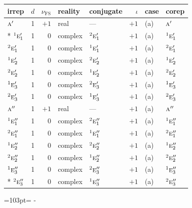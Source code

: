 \documentclass[10pt,a4paper]{article}
\newcommand{\needspace}[1]{\par\penalty-100\begingroup\dimen0=#1\relax\dimen2=\pagegoal
  \advance\dimen2-\pagetotal\ifdim\dimen0>\dimen2\relax\ifdim\dimen2>0pt\vfil\break\fi\fi
  \endgroup}
\numberwithin{equation}{section}
\newcommand{\irr}[1]{\text{\normalfont\scshape #1}}
\newcommand{\conjpair}[1]{{}^{#1}}
\newcommand{\fsind}{\nu_{\mathrm{FS}}}
\begin{document}
{\small\renewcommand{\arraystretch}{1.25}\setlength{\tabcolsep}{4pt}\begin{longtable}{@{}lrrllrll@{}}\toprule
irrep & $d$ & $\fsind$ & reality & conjugate & $\iota$ & case & corep\\\midrule\endhead
\bottomrule\endfoot\endlastfoot
$\irr{a}'$ & 1 & $+1$ & real & --- & $+1$ & (a) & $\irr{a}'$\\*
$\conjpair{1}\irr{e}_{1}'$ & 1 & $0$ & complex & $\conjpair{2}\irr{e}_{1}'$ & $+1$ & (a) & $\conjpair{1}\irr{e}_{1}'$\\
$\conjpair{2}\irr{e}_{1}'$ & 1 & $0$ & complex & $\conjpair{1}\irr{e}_{1}'$ & $+1$ & (a) & $\conjpair{2}\irr{e}_{1}'$\\
$\conjpair{1}\irr{e}_{2}'$ & 1 & $0$ & complex & $\conjpair{2}\irr{e}_{2}'$ & $+1$ & (a) & $\conjpair{1}\irr{e}_{2}'$\\
$\conjpair{2}\irr{e}_{2}'$ & 1 & $0$ & complex & $\conjpair{1}\irr{e}_{2}'$ & $+1$ & (a) & $\conjpair{2}\irr{e}_{2}'$\\
$\conjpair{1}\irr{e}_{3}'$ & 1 & $0$ & complex & $\conjpair{2}\irr{e}_{3}'$ & $+1$ & (a) & $\conjpair{1}\irr{e}_{3}'$\\
$\conjpair{2}\irr{e}_{3}'$ & 1 & $0$ & complex & $\conjpair{1}\irr{e}_{3}'$ & $+1$ & (a) & $\conjpair{2}\irr{e}_{3}'$\\
$\irr{a}''$ & 1 & $+1$ & real & --- & $+1$ & (a) & $\irr{a}''$\\
$\conjpair{1}\irr{e}_{1}''$ & 1 & $0$ & complex & $\conjpair{2}\irr{e}_{1}''$ & $+1$ & (a) & $\conjpair{1}\irr{e}_{1}''$\\
$\conjpair{2}\irr{e}_{1}''$ & 1 & $0$ & complex & $\conjpair{1}\irr{e}_{1}''$ & $+1$ & (a) & $\conjpair{2}\irr{e}_{1}''$\\
$\conjpair{1}\irr{e}_{2}''$ & 1 & $0$ & complex & $\conjpair{2}\irr{e}_{2}''$ & $+1$ & (a) & $\conjpair{1}\irr{e}_{2}''$\\
$\conjpair{2}\irr{e}_{2}''$ & 1 & $0$ & complex & $\conjpair{1}\irr{e}_{2}''$ & $+1$ & (a) & $\conjpair{2}\irr{e}_{2}''$\\
$\conjpair{1}\irr{e}_{3}''$ & 1 & $0$ & complex & $\conjpair{2}\irr{e}_{3}''$ & $+1$ & (a) & $\conjpair{1}\irr{e}_{3}''$\\*
$\conjpair{2}\irr{e}_{3}''$ & 1 & $0$ & complex & $\conjpair{1}\irr{e}_{3}''$ & $+1$ & (a) & $\conjpair{2}\irr{e}_{3}''$\\
\bottomrule\end{longtable}}
\needspace{103pt}
\end{document}

